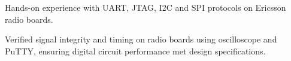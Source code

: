 \documentclass[A4,10pt]{article}
\newcommand{\resumeItem}[1]{
  \item\small{
    {#1 \vspace{-2pt}}
  }
}
\begin{document}
        \resumeItem{Hands-on experience with UART, JTAG, I2C and SPI protocols on Ericsson radio boards.} %
        \resumeItem{Verified signal integrity and timing on radio boards using oscilloscope and PuTTY, ensuring digital circuit performance met design specifications.}

      
\end{document}
